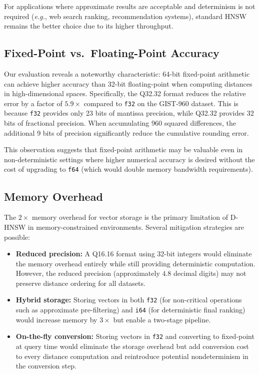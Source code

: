 \documentclass[10pt,journal,compsoc]{IEEEtran}
\newcommand{\dhnsw}{\textsc{D-HNSW}}
\newcommand{\hnsw}{\textsc{HNSW}}
\newcommand{\eg}{\textit{e.g.}}
\begin{document}
For applications where approximate results are acceptable and determinism is not required (\eg, web search ranking, recommendation systems), standard \hnsw{} remains the better choice due to its higher throughput.

\subsection{Fixed-Point vs.\ Floating-Point Accuracy}

Our evaluation reveals a noteworthy characteristic: 64-bit fixed-point arithmetic can achieve higher accuracy than 32-bit floating-point when computing distances in high-dimensional spaces. Specifically, the Q32.32 format reduces the relative error by a factor of $5.9\times$ compared to \texttt{f32} on the GIST-960 dataset. This is because \texttt{f32} provides only 23 bits of mantissa precision, while Q32.32 provides 32 bits of fractional precision. When accumulating 960 squared differences, the additional 9 bits of precision significantly reduce the cumulative rounding error.

This observation suggests that fixed-point arithmetic may be valuable even in non-deterministic settings where higher numerical accuracy is desired without the cost of upgrading to \texttt{f64} (which would double memory bandwidth requirements).

\subsection{Memory Overhead}

The $2\times$ memory overhead for vector storage is the primary limitation of \dhnsw{} in memory-constrained environments. Several mitigation strategies are possible:

\begin{itemize}[leftmargin=*]
  \item \textbf{Reduced precision:} A Q16.16 format using 32-bit integers would eliminate the memory overhead entirely while still providing deterministic computation. However, the reduced precision (approximately $4.8$ decimal digits) may not preserve distance ordering for all datasets.

  \item \textbf{Hybrid storage:} Storing vectors in both \texttt{f32} (for non-critical operations such as approximate pre-filtering) and \texttt{i64} (for deterministic final ranking) would increase memory by $3\times$ but enable a two-stage pipeline.

  \item \textbf{On-the-fly conversion:} Storing vectors in \texttt{f32} and converting to fixed-point at query time would eliminate the storage overhead but add conversion cost to every distance computation and reintroduce potential nondeterminism in the conversion step.
\end{itemize}
\end{document}
